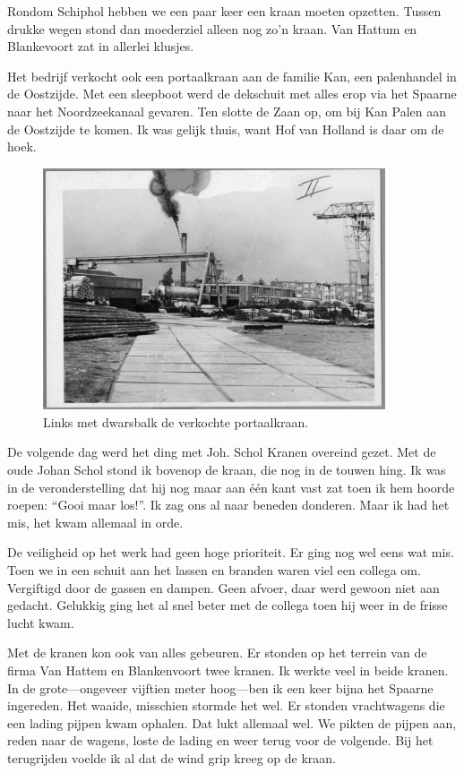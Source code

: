 \documentclass[12pt,twoside, openright]{memoir}
\begin{document}
Rondom Schiphol hebben we een paar keer een kraan moeten opzetten. Tussen drukke wegen stond dan moederziel alleen nog zo’n kraan. Van Hattum en Blankevoort zat in allerlei klusjes.

Het bedrijf verkocht ook een portaalkraan aan de familie Kan, een palenhandel in de Oostzijde. Met een sleepboot werd de dekschuit met alles erop via het Spaarne naar het Noordzeekanaal gevaren. Ten slotte de Zaan op, om bij Kan Palen aan de Oostzijde te komen. Ik was gelijk thuis, want Hof van Holland is daar om de hoek. 

\begin{figure}
\centering
\includegraphics[width=0.9\textwidth]{img/225kan}
\caption*{\footnotesize Links met dwarsbalk de verkochte portaalkraan.}
\end{figure}

De volgende dag werd het ding met Joh. Schol Kranen overeind gezet. 
Met de oude Johan Schol stond ik bovenop de kraan, die nog in de touwen hing. Ik was in de veronderstelling dat hij nog maar aan één kant vast zat toen ik hem hoorde roepen: ``Gooi maar los!''. Ik zag ons al naar beneden donderen. Maar ik had het mis, het kwam allemaal in orde. 

De veiligheid op het werk had geen hoge prioriteit. Er ging nog wel eens wat mis. Toen we in een schuit aan het lassen en branden waren viel een collega om. Vergiftigd door de gassen en dampen. Geen afvoer, daar werd gewoon niet aan gedacht. Gelukkig ging het al snel beter met de collega toen hij weer in de frisse lucht kwam.

Met de kranen kon ook van alles gebeuren. Er stonden op het terrein van de firma Van Hattem en Blankenvoort twee kranen. Ik werkte veel in beide kranen. In de grote---ongeveer vijftien meter hoog---ben ik een keer bijna het Spaarne ingereden. Het waaide, misschien stormde het wel. Er stonden vrachtwagens die een lading pijpen kwam ophalen. Dat lukt allemaal wel. We pikten de pijpen aan, reden naar de wagens, loste de lading en weer terug voor de volgende. Bij het terugrijden voelde ik al dat de wind grip kreeg op de kraan. 
\end{document}
